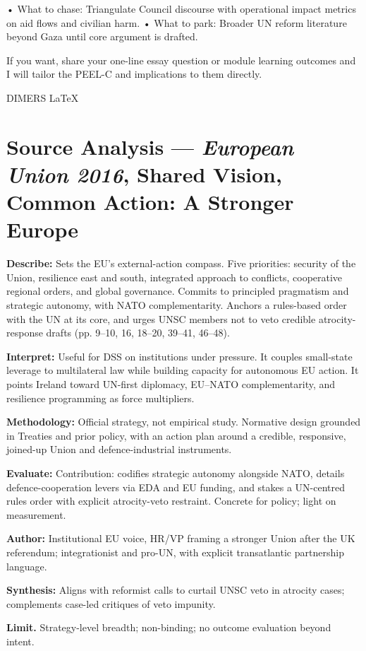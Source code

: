 • What to chase: Triangulate Council discourse with operational impact metrics on aid flows and civilian harm.
• What to park: Broader UN reform literature beyond Gaza until core argument is drafted.

If you want, share your one-line essay question or module learning outcomes and I will tailor the PEEL-C and implications to them directly.


\parencite{EU_2016}

DIMERS LaTeX

\section*{Source Analysis — \textit{European Union 2016}, Shared Vision, Common Action: A Stronger Europe}
\textbf{Describe:} Sets the EU’s external-action compass. Five priorities: security of the Union, resilience east and south, integrated approach to conflicts, cooperative regional orders, and global governance. Commits to principled pragmatism and strategic autonomy, with NATO complementarity. Anchors a rules-based order with the UN at its core, and urges UNSC members not to veto credible atrocity-response drafts (pp. 9–10, 16, 18–20, 39–41, 46–48).

\textbf{Interpret:} Useful for DSS on institutions under pressure. It couples small-state leverage to multilateral law while building capacity for autonomous EU action. It points Ireland toward UN-first diplomacy, EU–NATO complementarity, and resilience programming as force multipliers.

\textbf{Methodology:} Official strategy, not empirical study. Normative design grounded in Treaties and prior policy, with an action plan around a credible, responsive, joined-up Union and defence-industrial instruments.

\textbf{Evaluate:} Contribution: codifies strategic autonomy alongside NATO, details defence-cooperation levers via EDA and EU funding, and stakes a UN-centred rules order with explicit atrocity-veto restraint. Concrete for policy; light on measurement.

\textbf{Author:} Institutional EU voice, HR/VP framing a stronger Union after the UK referendum; integrationist and pro-UN, with explicit transatlantic partnership language.

\textbf{Synthesis:} Aligns with reformist calls to curtail UNSC veto in atrocity cases; complements case-led critiques of veto impunity.

\textbf{Limit.} Strategy-level breadth; non-binding; no outcome evaluation beyond intent.

